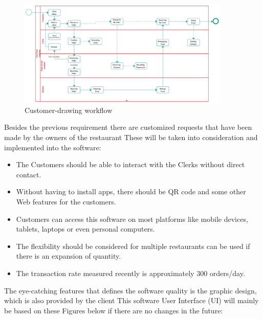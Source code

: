 \begin{figure}[H]
  \centering
  \includegraphics[width=0.9\textwidth]{./assets/t1/customer_figure.png}
  \caption{Customer-drawing workflow}
\end{figure}

Besides the previous requirement there are customized requests that have been made by the owners of the restaurant
These will be taken into consideration and implemented into the software:

\begin{itemize}
  \item The Customers should be able to interact with the Clerks without direct contact.
  \item Without having to install apps, there should be QR code and some other Web features for the customers.
  \item Customers can access this software on most platforms like mobile devices, tablets, laptops or even personal computers.
  \item The flexibility should be considered for multiple restaurants can be used if there is an expansion of quantity.
  \item The transaction rate measured recently is approximately 300 orders/day.
\end{itemize}

The eye-catching features that defines the software quality is the graphic design, which is also provided by the client
This software User Interface (UI) will mainly be based on these Figures below if there are no changes in the future:

